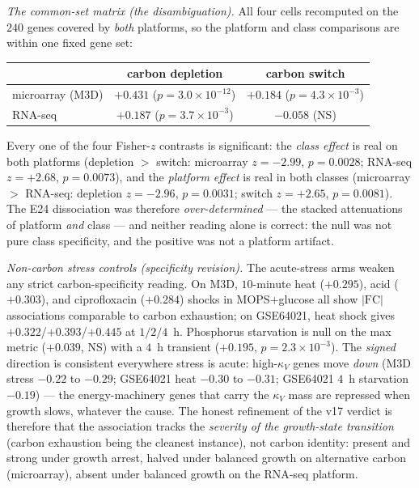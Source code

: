 \documentclass[11pt,a4paper]{article}
\theoremstyle{plain}
\theoremstyle{definition}
\theoremstyle{remark}
\begin{document}
\emph{The common-set matrix (the disambiguation).} All four cells
recomputed on the $240$ genes covered by \emph{both} platforms, so
the platform and class comparisons are within one fixed gene set:
\begin{center}
\begin{tabular}{lcc}
\hline
 & carbon depletion & carbon switch \\
\hline
microarray (M3D) & $+0.431$ ($p = 3.0 \times 10^{-12}$) &
$+0.184$ ($p = 4.3 \times 10^{-3}$) \\
RNA-seq & $+0.187$ ($p = 3.7 \times 10^{-3}$) &
$-0.058$ (NS) \\
\hline
\end{tabular}
\end{center}
Every one of the four Fisher-$z$ contrasts is significant: the
\emph{class effect} is real on both platforms (depletion $>$
switch: microarray $z = -2.99$, $p = 0.0028$; RNA-seq $z = +2.68$,
$p = 0.0073$), and the \emph{platform effect} is real in both
classes (microarray $>$ RNA-seq: depletion $z = -2.96$,
$p = 0.0031$; switch $z = +2.65$, $p = 0.0081$). The E24
dissociation was therefore \emph{over-determined} --- the stacked
attenuations of platform \emph{and} class --- and neither reading
alone is correct: the null was not pure class specificity, and the
positive was not a platform artifact.

\emph{Non-carbon stress controls (specificity revision).} The
acute-stress arms weaken any strict carbon-specificity reading.
On M3D, $10$-minute heat ($+0.295$), acid ($+0.303$), and
ciprofloxacin ($+0.284$) shocks in MOPS$+$glucose all show
$|\mathrm{FC}|$ associations comparable to carbon exhaustion; on
GSE64021, heat shock gives $+0.322$/$+0.393$/$+0.445$ at
$1/2/4$~h. Phosphorus starvation is null on the max metric
($+0.039$, NS) with a $4$~h transient ($+0.195$,
$p = 2.3 \times 10^{-3}$). The \emph{signed} direction is
consistent everywhere stress is acute: high-$\kappa_V$ genes move
\emph{down} (M3D stress $-0.22$ to $-0.29$; GSE64021 heat
$-0.30$ to $-0.31$; GSE64021 $4$~h starvation $-0.19$) --- the
energy-machinery genes that carry the $\kappa_V$ mass are
repressed when growth slows, whatever the cause. The honest
refinement of the v17 verdict is therefore that the association
tracks the \emph{severity of the growth-state transition} (carbon
exhaustion being the cleanest instance), not carbon identity:
present and strong under growth arrest, halved under balanced
growth on alternative carbon (microarray), absent under balanced
growth on the RNA-seq platform.
\end{document}
